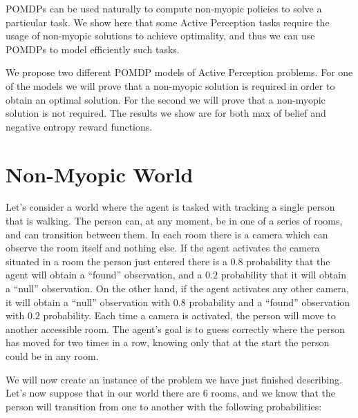POMDPs can be used naturally to compute non-myopic policies to solve a particular task. We show here
that some Active Perception tasks require the usage of non-myopic solutions to achieve optimality,
and thus we can use POMDPs to model efficiently such tasks.

We propose two different POMDP models of Active Perception problems. For one of the models we will
prove that a non-myopic solution is required in order to obtain an optimal solution. For the second
we will prove that a non-myopic solution is not required. The results we show are for both max of
belief and negative entropy reward functions.

\section{Non-Myopic World}

Let's consider a world where the agent is tasked with tracking a single person that is walking. The
person can, at any moment, be in one of a series of rooms, and can transition between them. In each
room there is a camera which can observe the room itself and nothing else. If the agent activates
the camera situated in a room the person just entered there is a $0.8$ probability that the agent will
obtain a ``found'' observation, and a $0.2$ probability that it will obtain a ``null'' observation.
On the other hand, if the agent activates any other camera, it will obtain a ``null'' observation
with $0.8$ probability and a ``found'' observation with $0.2$ probability. Each time a camera is
activated, the person will move to another accessible room. The agent's goal is to guess correctly
where the person has moved for two times in a row, knowing only that at the start the person could
be in any room.

We will now create an instance of the problem we have just finished describing. Let's now suppose
that in our world there are 6 rooms, and we know that the person will transition from one to another
with the following probabilities:

